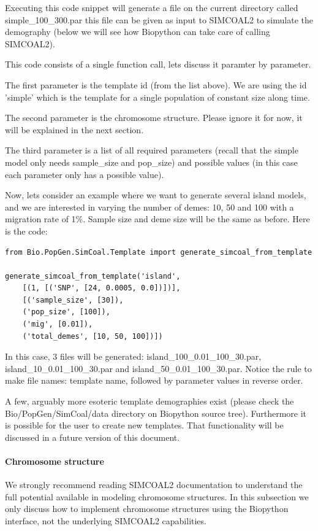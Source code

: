 \documentclass{report}
\begin{document}
Executing this code snippet will generate a file on the current directory called
simple\_100\_300.par this file can be given as input to SIMCOAL2 to simulate the
demography (below we will see how Biopython can take care of calling SIMCOAL2).

This code consists of a single function call, lets discuss it paramter by parameter.

The first parameter is the template id (from the list above). We are using the id
'simple' which is the template for a single population of constant size along time.

The second parameter is the chromosome structure. Please ignore it for now, it will be
explained in the next section.

The third parameter is a list of all required parameters (recall that the simple model
only needs sample\_size and pop\_size) and possible values (in this case each
parameter only has a possible value).

Now, lets consider an example where we want to generate several island models, and we
are interested in varying the number of demes: 10, 50 and 100 with a migration
rate of 1\%. Sample size and deme
size will be the same as before. Here is the code:


\begin{verbatim}
from Bio.PopGen.SimCoal.Template import generate_simcoal_from_template

generate_simcoal_from_template('island',
    [(1, [('SNP', [24, 0.0005, 0.0])])],
    [('sample_size', [30]),
    ('pop_size', [100]),
    ('mig', [0.01]),
    ('total_demes', [10, 50, 100])])
\end{verbatim}

In this case, 3 files will be generated: island\_100\_0.01\_100\_30.par,
island\_10\_0.01\_100\_30.par and island\_50\_0.01\_100\_30.par. Notice the
rule to make file names: template name, followed by parameter values in
reverse order.

A few, arguably more esoteric template demographies exist (please check the
Bio/PopGen/SimCoal/data directory on Biopython source tree). Furthermore it is possible
for the user to create new templates. That functionality will be discussed in a future
version of this document.

\paragraph{Chromosome structure}

We strongly recommend reading SIMCOAL2 documentation to understand the full potential
available in modeling chromosome structures. In this subsection we only discuss how
to implement chromosome structures using the Biopython interface, not the underlying
SIMCOAL2 capabilities.
\end{document}
